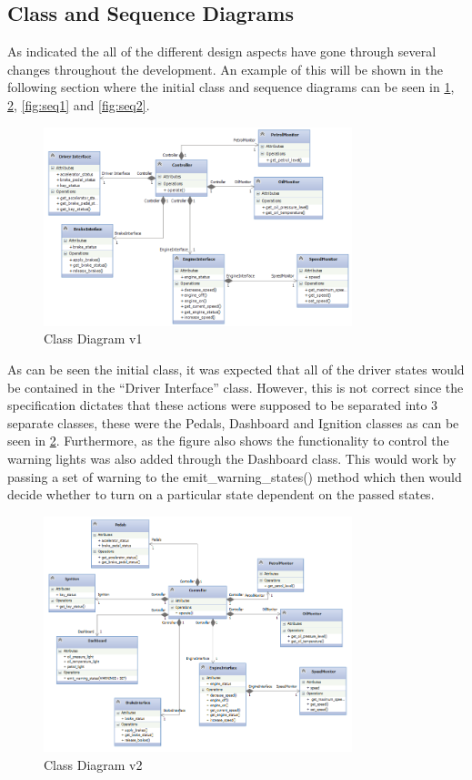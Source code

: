 \documentclass[12pt]{article}
\begin{document}
\subsection{Class and Sequence Diagrams}

As indicated the all of the different design aspects have gone through several changes throughout the development. An example of this will be shown in the following section where the initial class and sequence diagrams can be seen in \ref{fig:class1}, \ref{fig:class2}, \ref{fig:seq1} and \ref{fig:seq2}.


\begin{figure}[H]
	\centering
	\includegraphics[width=0.8\textwidth]{class_diagram_v1}
	\caption{Class Diagram v1}
	\label{fig:class1}
\end{figure}

As can be seen the initial class, it was expected that all of the driver states would be contained in the “Driver Interface” class. However, this is not correct since the specification dictates that these actions were supposed to be separated into 3 separate classes, these were the Pedals, Dashboard and Ignition classes as can be seen in \ref{fig:class2}. Furthermore, as the figure also shows the functionality to control the warning lights was also added through the Dashboard class. This would work by passing a set of warning to the emit\_warning\_states() method which then would decide whether to turn on a particular state dependent on the passed states. 

\begin{figure}[H]
	\centering
	\includegraphics[width=0.8\textwidth]{class_diagram_v2}
	\caption{Class Diagram v2}
	\label{fig:class2}
\end{figure}
\end{document}
